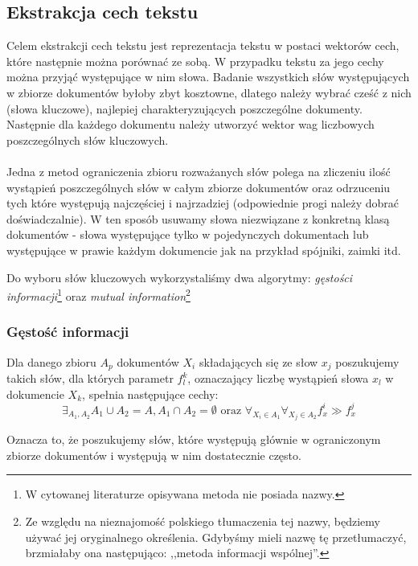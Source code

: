 \documentclass{classrep}
\begin{document}
\subsection{Ekstrakcja cech tekstu}
Celem ekstrakcji cech tekstu jest reprezentacja tekstu w postaci wektorów cech, które następnie można porównać ze sobą. W przypadku tekstu za jego cechy można przyjąć występujące w nim słowa. Badanie wszystkich słów występujących w zbiorze dokumentów byłoby zbyt kosztowne, dlatego należy wybrać cześć z nich (słowa kluczowe), najlepiej charakteryzujących poszczególne dokumenty. Następnie dla każdego dokumentu należy utworzyć wektor wag liczbowych poszczególnych słów kluczowych.

\paragraph{}
Jedna z metod ograniczenia zbioru rozważanych słów polega na zliczeniu ilość wystąpień poszczególnych słów w całym zbiorze dokumentów oraz odrzuceniu tych które występują najczęściej i najrzadziej (odpowiednie progi należy dobrać doświadczalnie). W ten sposób usuwamy słowa niezwiązane z konkretną klasą dokumentów - słowa występujące tylko w pojedynczych dokumentach lub występujące w prawie każdym dokumencie jak na przykład spójniki, zaimki itd.

Do wyboru słów kluczowych wykorzystaliśmy dwa algorytmy: \textit{gęstości informacji}\footnote{W cytowanej literaturze opisywana metoda nie posiada nazwy.} oraz \textit{mutual information}\footnote{Ze względu na nieznajomość polskiego tłumaczenia tej nazwy, będziemy używać jej oryginalnego określenia. Gdybyśmy mieli nazwę tę przetłumaczyć, brzmiałaby ona następująco: ,,metoda informacji wspólnej''.}

\subsubsection{Gęstość informacji}
Dla danego zbioru $A_p$ dokumentów $X_i$ składających się ze słow $x_j$ poszukujemy takich słów, dla których parametr $f^k_l$, oznaczający liczbę wystąpień słowa $x_l$ w dokumencie $X_k$, spełnia następujące cechy:
\begin{equation}
 \exists_{A_1, A_2} A_1 \cup A_2 = A, A_1 \cap A_2 = \emptyset \mbox{ oraz } \forall_{X_i \in A_1} \forall_{X_j \in A_2} f^i_x \gg f^j_x
\end{equation}

Oznacza to, że poszukujemy słów, które występują głównie w ograniczonym zbiorze dokumentów i występują w nim dostatecznie często.
\end{document}
